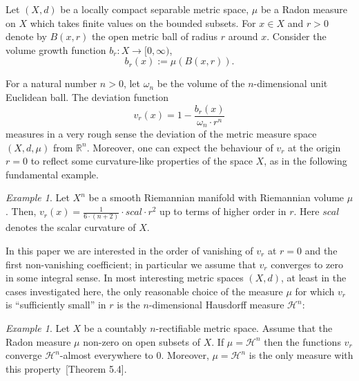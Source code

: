 \documentclass[12pt,leqno,intlimits]{amsart}
\numberwithin{equation}{section}
\theoremstyle{definition}
\theoremstyle{remark}
\newtheorem{ex}[thm]{Example}
\newcommand{\R}{\mathbb{R}}
\def\:{\colon}
\begin{document}
Let $(X,d)$ be a locally compact separable metric space,
$\mu$ be a Radon measure on $X$ which takes finite values on the bounded subsets.
{For $x\in X$ and $r>0$
denote by $B(x,r)$ the open metric ball of radius $r$ around $x$. Consider the  volume growth function}  $b_r\:X\to [0,\infty )$,
\begin{equation}
b_r(x):=\mu (B(x,r)).
\end{equation}
{ For a natural number $n>0$,  let $\omega _n$ be the volume of the $n$-dimensional unit Euclidean ball. The  deviation function
$$v_r (x)=1 - \frac {b_r (x)} { \omega _n{\cdot}r^n} $$
measures in a very rough sense the deviation of the metric measure space $(X,d,\mu)$ from $\R^n$.  Moreover, one can expect the behaviour of $v_r$ at the origin $r=0$ to reflect some curvature-like properties of the space $X$, as in the following fundamental example.

\begin{ex} \label{smoothscal}
Let $X^n$ be a smooth Riemannian manifold with Riemannian volume $\mu$. Then, $v_r (x)= \frac 1 {6\cdot(n+2)}\cdot scal \cdot r^2$ up to terms of higher order in $r$.  Here $scal$ denotes the scalar curvature of $X$.
\end{ex}

In this paper we are interested in the order of vanishing of $v_r$ at $r=0$  and the first non-vanishing coefficient;
in particular we assume that $v_r$ converges to zero in some integral sense.
In most interesting metric spaces $(X,d)$, at least in the cases investigated here, the only reasonable choice of the measure $\mu$ for which $v_r$ is ``sufficiently small'' in $r$ is the $n$-dimensional Hausdorff measure $\mathcal H^n$:

\begin{ex}      \label{ex:rect}
Let $X$ be  a countably $n$-rectifiable metric space.
Assume that the Radon measure $\mu$  non-zero on open subsets of $X$.
If $\mu =\mathcal H^n$ then the functions $v_r$ converge $\mathcal H^n$-almost everywhere to $0$. Moreover, $\mu=\mathcal H^n$  is the only measure  with this property~\cite{AmbKirk}[Theorem 5.4].
 \end{ex}

}
\end{document}
